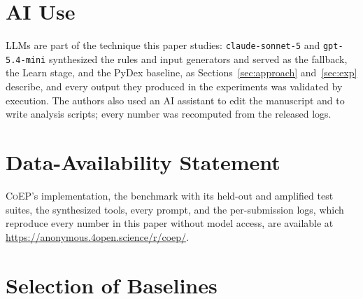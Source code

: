 \documentclass[acmsmall,screen,review,anonymous,nonacm]{acmart}
\newcommand{\tool}{\textsc{CoEP}\xspace}
\newcommand{\cs}{\texttt{claude-sonnet-5}\xspace}
\newcommand{\gm}{\texttt{gpt-5.4-mini}\xspace}
\begin{document}
\section*{AI Use}
LLMs are part of the technique this paper studies: \cs and \gm synthesized the rules and input generators and served as the fallback, the Learn stage, and the PyDex baseline, as Sections~\ref{sec:approach} and~\ref{sec:exp} describe, and every output they produced in the experiments was validated by execution. The authors also used an AI assistant to edit the manuscript and to write analysis scripts; every number was recomputed from the released logs.

\section*{Data-Availability Statement}
\tool's implementation, the benchmark with its held-out and amplified test suites, the synthesized tools, every prompt, and the per-submission logs, which reproduce every number in this paper without model access, are available at \url{https://anonymous.4open.science/r/coep/}.




\appendix
\section{Selection of Baselines}
\label{app:baselines}
\end{document}
